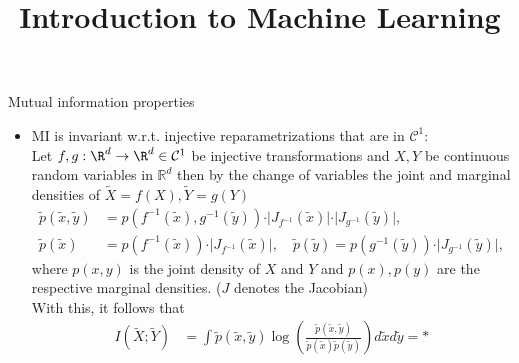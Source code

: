 \documentclass[11pt,compress,t,notes=noshow, xcolor=table]{beamer}
\title{Introduction to Machine Learning}
\begin{document}
    

\begin{vbframe} {Mutual information properties}
\begin{itemize}
    \item MI is invariant w.r.t. injective reparametrizations that are in $\mathcal{C}^1:$\\
    \medskip
    Let $f, g: \R^d\rightarrow\R^d \in \mathcal{C}^1$ be injective transformations and $X, Y$ be continuous random variables in $\mathbb{R}^d$ then by the change of variables the joint and marginal densities of  $\tilde{X} = f(X), \tilde{Y} = g(Y)$
    \begin{align*}
        \tilde{p}(\tilde{x}, \tilde{y}) &= p(f^{-1}(\tilde{x}), g^{-1}(\tilde{y}))\cdot\vert J_{f^{-1}}(\tilde{x})\vert\cdot\vert J_{g^{-1}}(\tilde{y})\vert, \\
        \tilde{p}(\tilde{x}) &= p(f^{-1}(\tilde{x}))\cdot\vert J_{f^{-1}}(\tilde{x})\vert,\quad \tilde{p}(\tilde{y}) = p(g^{-1}(\tilde{y}))\cdot\vert J_{g^{-1}}(\tilde{y})\vert, 
    \end{align*}
    where $p(x, y)$ is the joint density of $X$ and $Y$ and $p(x), p(y)$ are the respective marginal densities. ($J$ denotes the Jacobian) \\
    \medskip
    With this, it follows that 
    \begin{align*}
      I(\tilde{X}; \tilde{Y}) &= \int \tilde{p}(\tilde{x}, \tilde{y}) \log\left(\frac{\tilde{p}(\tilde{x}, \tilde{y})}{\tilde{p}(\tilde{x})\tilde{p}(\tilde{y})}\right)d\tilde{x}d\tilde{y}  = *
    \end{align*}
\end{itemize}
\end{vbframe}
\end{document}
